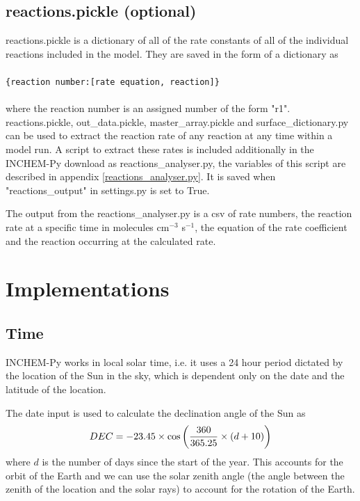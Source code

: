\documentclass[a4paper]{refart}
\begin{document}
\subsection{reactions.pickle (optional)}
reactions.pickle is a dictionary of all of the rate constants of all of the individual reactions included in the model. They are saved in the form of a dictionary as\\
\\
\texttt{\{reaction number:[rate equation, reaction]\}}\\
\\
where the reaction number is an assigned number of the form "r1". reactions.pickle, out\_data.pickle, master\_array.pickle and surface\_dictionary.py can be used to extract the reaction rate of any reaction at any time within a model run. A script to extract these rates is included additionally in the INCHEM-Py download as reactions\_analyser.py, the variables of this script are described in appendix \ref{reactions_analyser.py}. It is saved when "reactions\_output" in settings.py is set to True.

The output from the reactions\_analyser.py is a csv of rate numbers, the reaction rate at a specific time in molecules cm$^{-3}$ s$^{-1}$, the equation of the rate coefficient and the reaction occurring at the calculated rate.

\newpage
\section{Implementations}
\subsection{Time}
INCHEM-Py works in local solar time, i.e. it uses a 24 hour period dictated by the location of the Sun in the sky, which is dependent only on the date and the latitude of the location. 

The date input is used to calculate the declination angle of the Sun as
\begin{equation}\index{declination angle}
    DEC = -23.45 \times \cos\left(\frac{360}{365.25}\times (d+10)\right)
\end{equation}
where $d$ is the number of days since the start of the year. This accounts for the orbit of the Earth and we can use the solar zenith angle (the angle between the zenith of the location and the solar rays) to account for the rotation of the Earth.
\end{document}
